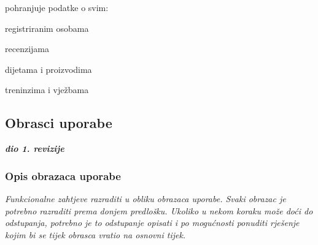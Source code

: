 \begin{packed_enum}
				\begin{packed_enum}
					
					\item pohranjuje podatke o svim: 
					
					\begin{packed_enum}
						
						\item registriranim osobama
						\item recenzijama
						\item dijetama i proizvodima
						\item treninzima i vježbama
					
					\end{packed_enum}	
				
				\end{packed_enum}
			
			\end{packed_enum}
			
			\eject 
			
			
				
			\subsection{Obrasci uporabe}
				
				\textbf{\textit{dio 1. revizije}}
				
				\subsubsection{Opis obrazaca uporabe}
					\textit{Funkcionalne zahtjeve razraditi u obliku obrazaca uporabe. Svaki obrazac je potrebno razraditi prema donjem predlošku. Ukoliko u nekom koraku može doći do odstupanja, potrebno je to odstupanje opisati i po mogućnosti ponuditi rješenje kojim bi se tijek obrasca vratio na osnovni tijek.}\\
					

